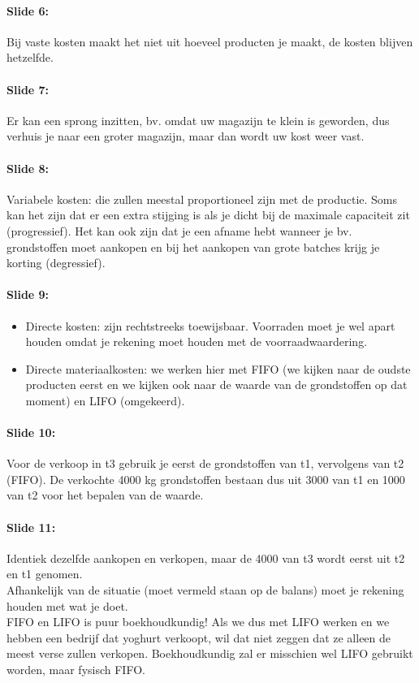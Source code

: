 \documentclass[10pt,a4paper]{report}
\begin{document}
\paragraph{Slide 6:} Bij vaste kosten maakt het niet uit hoeveel producten je maakt, de kosten blijven hetzelfde.

\paragraph{Slide 7:} Er kan een sprong inzitten, bv. omdat uw magazijn te klein is geworden, dus verhuis je naar een groter magazijn, maar dan wordt uw kost weer vast.

\paragraph{Slide 8:} Variabele kosten: die zullen meestal proportioneel zijn met de productie. Soms kan het zijn dat er een extra stijging is als je dicht bij de maximale capaciteit zit (progressief). Het kan ook zijn dat je een afname hebt wanneer je bv. grondstoffen moet aankopen en bij het aankopen van grote batches krijg je korting (degressief). 

\paragraph{Slide 9:}
\begin{itemize}
\item Directe kosten: zijn rechtstreeks toewijsbaar. Voorraden moet je wel apart houden omdat je rekening moet houden met de voorraadwaardering.
\item Directe materiaalkosten: we werken hier met FIFO (we kijken naar de oudste producten eerst en we kijken ook naar de waarde van de grondstoffen op dat moment) en LIFO (omgekeerd).
\end{itemize}

\paragraph{Slide 10:} Voor de verkoop in t3 gebruik je eerst de grondstoffen van t1, vervolgens van t2 (FIFO). De verkochte 4000 kg grondstoffen bestaan dus uit 3000 van t1 en 1000 van t2 voor het bepalen van de waarde.

\paragraph{Slide 11:} Identiek dezelfde aankopen en verkopen, maar de 4000 van t3 wordt eerst uit t2 en t1 genomen.\\
Afhankelijk van de situatie (moet vermeld staan op de balans) moet je rekening houden met wat je doet.\\
FIFO en LIFO is puur boekhoudkundig! Als we dus met LIFO werken en we hebben een bedrijf dat yoghurt verkoopt, wil dat niet zeggen dat ze alleen de meest verse zullen verkopen. Boekhoudkundig zal er misschien wel LIFO gebruikt worden, maar fysisch FIFO.
\end{document}
